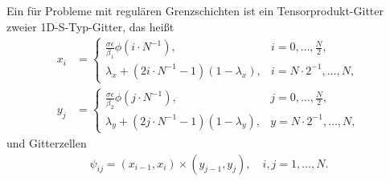 \begin{definition}\label{def:7-3}
  Ein  für Probleme mit regulären Grenzschichten ist ein Tensorprodukt-Gitter zweier 1D-S-Typ-Gitter, das heißt
  \begin{align*}
    x_{i} &=
    \begin{cases}
      \frac{\sigma\epsilon}{\beta_{1}} \phi(i \cdot N^{-1}), & i = 0, \dots, \frac N2, \\
      \lambda_{x} + (2i\cdot N^{-1} - 1)(1 - \lambda_{x}), & i = N\cdot2^{-1}, \dots, N, 
    \end{cases}\\
    y_{j} &=
    \begin{cases}
      \frac{\sigma\epsilon}{\beta_{2}} \phi(j \cdot N^{-1}), & j = 0, \dots, \frac N2, \\
      \lambda_{y} + (2j\cdot N^{-1} - 1)(1 - \lambda_{y}), & y = N\cdot2^{-1}, \dots, N, 
    \end{cases}
  \end{align*}
und Gitterzellen
\begin{align*}
  \psi_{ij} = (x_{i-1}, x_{i}) \times (y_{j-1}, y_{j}), \quad i, j = 1, \dots, N. 
\end{align*}
\begin{figure}[ht!]
  \centering
\end{figure}
\end{definition}
